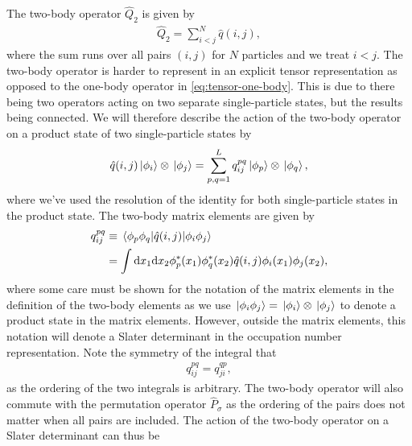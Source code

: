        The two-body operator $\hat{Q}_2$ is given by
        \begin{align}
            \hat{Q}_2
            = \sum_{i < j}^{N}
            \hat{q}(i, j),
        \end{align}
        where the sum runs over all pairs $(i, j)$ for $N$ particles and we
        treat $i < j$.
        The two-body operator is harder to represent in an explicit tensor
        representation as opposed to the one-body operator in
        \autoref{eq:tensor-one-body}.
        This is due to there being two operators acting on two separate
        single-particle states, but the results being connected.
        We will therefore describe the action of the two-body operator on a
        product state of two single-particle states by
        \begin{align}
            \hat{q}(i, j)\ket*{\phi_i}\otimes\ket*{\phi_j}
            = \sum_{p, q = 1}^{L}
            q^{pq}_{ij}
            \ket*{\phi_p}\otimes\ket*{\phi_q},
        \end{align}
        where we've used the resolution of the identity for both single-particle
        states in the product state.
        The two-body matrix elements are given by
        \begin{align}
            q^{pq}_{ij}
            &\equiv
            \mel*{\phi_p\phi_q}{\hat{q}(i, j)}{\phi_i\phi_j}
            \\
            &=
            \int\dd x_1 \dd x_2
            \phi^{*}_{p}(x_1)\phi^{*}_{q}(x_2)
            \hat{q}(i, j)
            \phi_i(x_1)\phi_j(x_2),
        \end{align}
        where some care must be shown for the notation of the matrix elements in
        the definition of the two-body elements as we use $\ket*{\phi_i\phi_j} =
        \ket*{\phi_i}\otimes\ket*{\phi_j}$ to denote a product state in the matrix
        elements.
        However, outside the matrix elements, this notation will denote a Slater
        determinant in the occupation number representation.
        Note the symmetry of the integral that
        \begin{align}
            q^{pq}_{ij} = q^{qp}_{ji},
            \label{eq:symmetry-two-body}
        \end{align}
        as the ordering of the two integrals is arbitrary.
        The two-body operator will also commute with the permutation operator
        $\hat{P}_{\sigma}$ as the ordering of the pairs does not matter when all
        pairs are included.
        The action of the two-body operator on a Slater determinant can thus be
